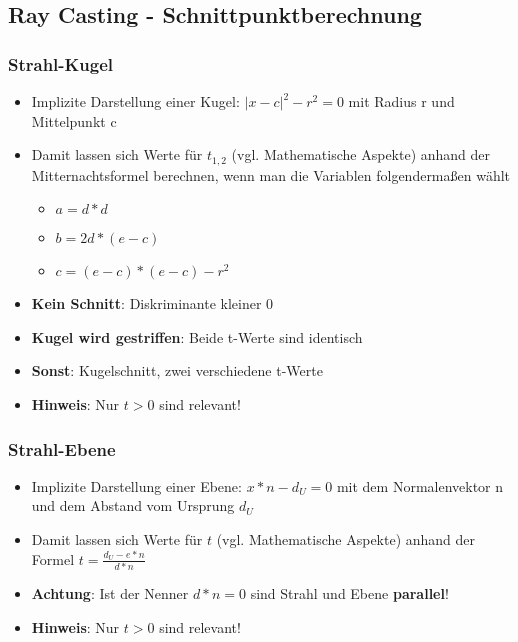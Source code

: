 \documentclass[10pt,a4paper]{article}
\begin{document}
	\newpage
	\subsection{Ray Casting - Schnittpunktberechnung}
	\label{rt:sub:ray_casting_schnittpunktberechnung}

	\subsubsection{Strahl-Kugel}
	\label{rt:ssub:strahl_kugel}

	\begin{itemize}
		\item Implizite Darstellung einer Kugel: $|x - c|^2 - r^2 = 0$ mit Radius r und Mittelpunkt c
		\item Damit lassen sich Werte für $t_{1,2}$ (vgl. Mathematische Aspekte) anhand der Mitternachtsformel berechnen, wenn man die Variablen folgendermaßen wählt
		\begin{itemize}
			\item $a = d * d$
			\item $b = 2d * (e - c)$
			\item $c = (e - c) * (e - c) - r^2$
		\end{itemize}
		\item \textbf{Kein Schnitt}: Diskriminante kleiner 0
		\item \textbf{Kugel wird gestriffen}: Beide t-Werte sind identisch
		\item \textbf{Sonst}: Kugelschnitt, zwei verschiedene t-Werte
		\item \textbf{Hinweis}: Nur $t > 0$ sind relevant!
	\end{itemize}

	\subsubsection{Strahl-Ebene}
	\label{rt:ssub:strahl_ebene}
	
	\begin{itemize}
		\item Implizite Darstellung einer Ebene: $x * n - d_U = 0$ mit dem Normalenvektor n und dem Abstand vom Ursprung $d_U$
		\item Damit lassen sich Werte für $t$ (vgl. Mathematische Aspekte) anhand der Formel $t = \frac{d_U - e * n}{d * n}$
		\item \textbf{Achtung}: Ist der Nenner $d * n = 0$ sind Strahl und Ebene \textbf{parallel}!
		\item \textbf{Hinweis}: Nur $t > 0$ sind relevant!
	\end{itemize}
\end{document}
